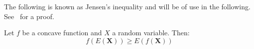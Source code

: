 The following is known as Jensen's inequality and will be of use in the following. See~\cite{Cover_91} for a proof.
\begin{theorem} Let $f$ be a concave function and $X$ a random variable. Then: 
  \label{th:jensen}
  \begin{equation*}
    f(E(\mathbf{X}))\geq E(f(\mathbf{X}))
  \end{equation*}
\end{theorem}
%
%
%
%


